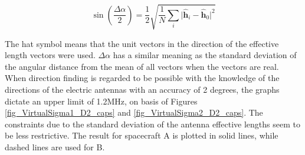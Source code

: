 \documentclass[a4paper,14pt]{extbook}
\begin{document}
\begin{equation}
\sin (\frac{ \Delta \alpha}{2}) = \frac{1}{2}\sqrt{\frac{1}{N}
\sum_i \vert \hat{\textbf{h}}_i - \hat{\textbf{h}}_0 \vert^2}
\end{equation}



The hat symbol means that the unit vectors in the direction of the effective length vectors were used. $\Delta \alpha$ has a similar meaning as the standard deviation of the
angular distance from the mean of all vectors when the vectors are
real.\\



When direction finding is regarded to be possible with the knowledge of the directions of the electric antennas with an accuracy of 2 degrees, the graphs dictate an upper limit of 1.2MHz, on basis of Figures \ref{fig_VirtualSigma1_D2_caps} and \ref{fig_VirtualSigma2_D2_caps}. The constraints due to the standard deviation of the antenna effective lengths seem to be less restrictive. The result for spacecraft A is plotted in solid lines, while dashed lines are used for B.
\end{document}

